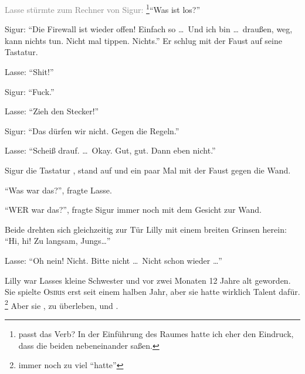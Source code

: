 \textcolor{gray}{Lasse stürmte zum Rechner von Sigur:} \footnote{passt das Verb? In der Einführung des Raumes hatte ich eher den Eindruck, dass die beiden nebeneinander saßen.}\enquote{Was ist los?}

Sigur: \enquote{Die Firewall ist wieder offen! Einfach so \dots\  Und ich bin \dots\  draußen, weg, kann nichts tun.
Nicht mal tippen.
Nichts.} Er schlug mit der Faust auf seine Tastatur.

Lasse: \enquote{Shit!}

Sigur: \enquote{Fuck.}

Lasse: \enquote{Zieh den Stecker!}

Sigur: \enquote{Das dürfen wir nicht.
Gegen die Regeln.}

Lasse: \enquote{Scheiß drauf.
\dots\  Okay.
Gut, gut.
Dann eben nicht.} 

Sigur  die Tastatur , stand auf und  ein paar Mal mit der Faust gegen die Wand.

\enquote{Was war das?}, fragte Lasse.

\enquote{WER war das?}, fragte Sigur immer noch mit dem Gesicht zur Wand.

Beide drehten sich gleichzeitig zur Tür Lilly  mit einem breiten Grinsen herein: \enquote{Hi, hi! Zu langsam, Jungs\dots}

Lasse: \enquote{Oh nein! Nicht.
Bitte nicht \dots\  Nicht schon wieder \dots} 

Lilly war Lasses kleine Schwester und vor zwei Monaten 12 Jahre alt geworden.
Sie spielte \textsc{Osiris} erst seit einem halben Jahr, aber sie hatte wirklich Talent dafür.
\footnote{immer noch zu viel \enquote{hatte}}
Aber sie , zu überleben, und .

